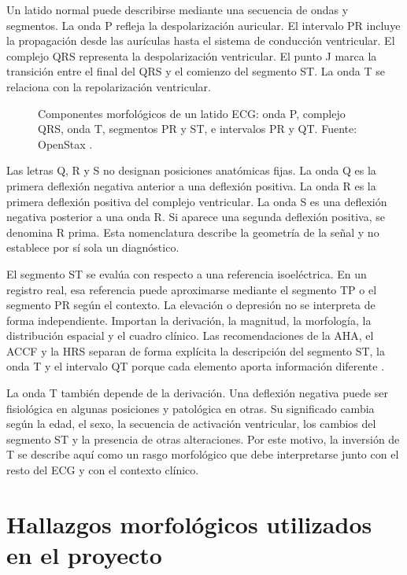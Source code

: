 Un latido normal puede describirse mediante una secuencia de ondas y segmentos. La onda P refleja la despolarización auricular. El intervalo PR incluye la propagación desde las aurículas hasta el sistema de conducción ventricular. El complejo QRS representa la despolarización ventricular. El punto J marca la transición entre el final del QRS y el comienzo del segmento ST. La onda T se relaciona con la repolarización ventricular.

\begin{figure}[H]
  \centering
  \caption{Componentes morfológicos de un latido ECG: onda P, complejo QRS, onda T, segmentos PR y ST, e intervalos PR y QT. Fuente: OpenStax \cite{openstaxApecg}.}
  \label{fig:morfologia_ecg}
\end{figure}

Las letras Q, R y S no designan posiciones anatómicas fijas. La onda Q es la primera deflexión negativa anterior a una deflexión positiva. La onda R es la primera deflexión positiva del complejo ventricular. La onda S es una deflexión negativa posterior a una onda R. Si aparece una segunda deflexión positiva, se denomina R prima. Esta nomenclatura describe la geometría de la señal y no establece por sí sola un diagnóstico.

El segmento ST se evalúa con respecto a una referencia isoeléctrica. En un registro real, esa referencia puede aproximarse mediante el segmento TP o el segmento PR según el contexto. La elevación o depresión no se interpreta de forma independiente. Importan la derivación, la magnitud, la morfología, la distribución espacial y el cuadro clínico. Las recomendaciones de la AHA, el ACCF y la HRS separan de forma explícita la descripción del segmento ST, la onda T y el intervalo QT porque cada elemento aporta información diferente \cite{rautaharju2009st}.

La onda T también depende de la derivación. Una deflexión negativa puede ser fisiológica en algunas posiciones y patológica en otras. Su significado cambia según la edad, el sexo, la secuencia de activación ventricular, los cambios del segmento ST y la presencia de otras alteraciones. Por este motivo, la inversión de T se describe aquí como un rasgo morfológico que debe interpretarse junto con el resto del ECG y con el contexto clínico.

\section{Hallazgos morfológicos utilizados en el proyecto}

